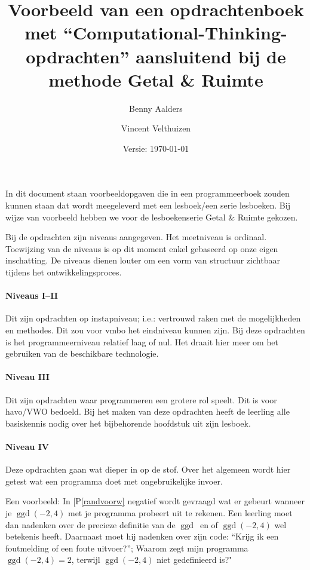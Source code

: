 \documentclass[a4paper]{article}
\author{Benny Aalders \and Vincent Velthuizen}
\title{\vspace*{-1.9in}Voorbeeld van een opdrachtenboek met {``Computational-Thinking-opdrachten''} aansluitend bij de methode {Getal \& Ruimte}}
\date{Versie: \today}
\makeatletter
\newlength{\leftoflengthopdr}
\newcounter{opdracht}
\newcounter{deelopdracht}[opdracht]
\newcounter{niveaudummie}
\newcounter{dummie}
\newif\if@beginopdracht
\def\nivset#1{\setcounter{niveaudummie}{#1}\Roman{niveaudummie}}
\def\opdracht{\@ifnextchar[{\opdrachtniv}{\opdrachtzonderniv}}
\def\opdrachtzonderniv#1{%
	\begin{tikzpicture}[baseline=(nodename.base)]
		 	\node[draw=opdrachtkleur,fill=opdrachtkleur,text=white] (nodename) {\bfseries #1};
		\end{tikzpicture}%
		}
\def\opdrachtniv[#1]{%
	\refstepcounter{opdracht}%
	\bigskip\bigskip%
	\makebox[0pt][r]{%
		\begin{tikzpicture}[baseline=(nodename.base)]
		 	\path[draw=opdrachtkleur] (-3em,-0.75em) rectangle (1em,0.75em);
		 	\node (nodename) [text=opdrachtkleur] at (-2em,0) {\bfseries\nivset{#1}};
		 	\path[draw=opdrachtkleur,fill=opdrachtkleur,text=white] (-1em,-0.75em) rectangle (1em,0.75em) (0,0) node {\bfseries P\theopdracht};
		\end{tikzpicture}%
		\hspace{\leftoflengthopdr}%
		}%
		\@beginopdrachttrue%
		\ignorespaces%
	}
\def\refopdracht#1{%
		\@ifnextchar\bgroup%
		{\@deelopdrachtref{#1}}%
		{\opdracht{P\ref{#1}}}%
		}
\def\@deelopdrachtref#1#2{\opdracht{P\ref{#1}(\textbf{\ref{#2}})}}
\newcommand\ggd{\ensuremath{\operatorname{ggd}}}
\makeatother
\begin{document}
\maketitle
In dit document staan voorbeeldopgaven die in een programmeerboek zouden kunnen staan dat wordt meegeleverd met een lesboek/een serie lesboeken. Bij wijze van voorbeeld hebben we voor de lesboekenserie Getal \& Ruimte  gekozen. 

Bij de opdrachten zijn niveaus aangegeven. Het meetniveau is ordinaal. Toewijzing van de niveaus is op dit moment enkel gebaseerd op onze eigen inschatting. De niveaus dienen louter om een vorm van structuur zichtbaar tijdens het ontwikkelingsproces. 

\paragraph{Niveaus I--II} Dit zijn opdrachten op instapniveau; i.e.: vertrouwd raken met de mogelijkheden en methodes. Dit zou voor vmbo het eindniveau  kunnen  zijn. 
Bij deze opdrachten is het programmeerniveau relatief laag of nul. Het draait hier meer om het gebruiken van de beschikbare technologie.

\paragraph{Niveau III} Dit zijn opdrachten waar programmeren een grotere rol speelt. Dit is voor havo/VWO bedoeld.  Bij het maken van deze opdrachten heeft de leerling alle basiskennis nodig over het bijbehorende hoofdstuk uit zijn lesboek. 

\paragraph{Niveau IV} Deze opdrachten gaan wat dieper in op de stof. Over het algemeen wordt hier getest wat een programma doet met ongebruikelijke invoer. 

Een voorbeeld: In \refopdracht {randvoorw}{negatief} wordt gevraagd wat er gebeurt wanneer je $\ggd(-2,4)$ met je programma probeert uit te rekenen. Een leerling moet dan nadenken over de precieze definitie van de \ggd\ en of $\ggd(-2,4)$ wel betekenis heeft. Daarnaast moet hij nadenken over zijn code: ``Krijg ik een foutmelding of een foute uitvoer?''; Waarom zegt mijn programma $\ggd(-2,4)=2$, terwijl $\ggd(-2,4)$ niet gedefinieerd is?"
\end{document}
